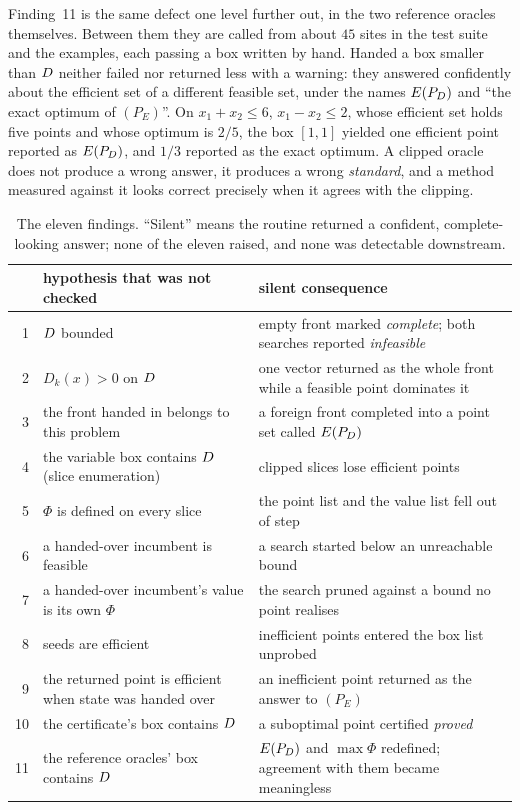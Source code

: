 \documentclass[11pt,a4paper]{article}
\begin{document}
Finding~11 is the same defect one level further out, in the two reference
oracles themselves.  Between them they are called from about $45$ sites in the
test suite and the examples, each passing a box written by hand.  Handed a box
smaller than $D$ neither failed nor returned less with a warning: they
answered confidently about the efficient set of a different feasible set, under
the names $E(P_{D})$ and ``the exact optimum of $(P_E)$''.  On $x_1 + x_2 \leqslant
6$, $x_1 - x_2 \leqslant 2$, whose efficient set holds five points and whose
optimum is $2/5$, the box $[1,1]$ yielded one efficient point reported as $E(P_{D})$,
and $1/3$ reported as the exact optimum.  A clipped oracle does not produce a
wrong answer, it produces a wrong \emph{standard}, and a method measured
against it looks correct precisely when it agrees with the clipping.

\begin{table}[h]
\centering
\caption{The eleven findings.  ``Silent'' means the routine returned a
confident, complete-looking answer; none of the eleven raised, and none was
detectable downstream.}
\label{tab:audit}
\small
\begin{tabular}{rp{}p{}}
\toprule
 & hypothesis that was not checked & silent consequence \\
\midrule
1 & $D$ bounded & empty front marked \emph{complete}; both searches
    reported \emph{infeasible} \\
2 & $D_k(x) > 0$ on $D$ & one vector returned as the whole front while a
    feasible point dominates it \\
3 & the front handed in belongs to this problem & a foreign front completed
    into a point set called $E(P_{D})$ \\
4 & the variable box contains $D$ (slice enumeration) & clipped slices lose
    efficient points \\
5 & $\Phi$ is defined on every slice & the point list and the value list fell
    out of step \\
6 & a handed-over incumbent is feasible & a search started below an
    unreachable bound \\
7 & a handed-over incumbent's value is its own $\Phi$ & the search pruned
    against a bound no point realises \\
8 & seeds are efficient & inefficient points entered the box list unprobed \\
9 & the returned point is efficient when state was handed over & an
    inefficient point returned as the answer to $(P_E)$ \\
10 & the certificate's box contains $D$ & a suboptimal point certified
    \emph{proved} \\
11 & the reference oracles' box contains $D$ & $E(P_{D})$ and $\max \Phi$
    redefined; agreement with them became meaningless \\
\bottomrule
\end{tabular}
\end{table}
\end{document}

